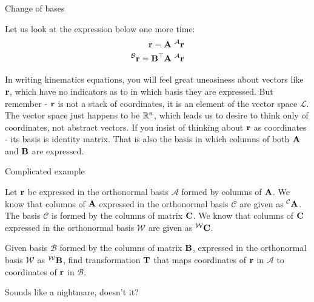 \documentclass{beamer}
\begin{document}
\begin{frame}{Change of bases}
	\begin{flushleft}
		
	 Let us look at the expression below one more time:
		\begin{align}
			\mathbf{r} = \mathbf{A} \ ^\mathcal{A}\mathbf{r} \\
			^\mathcal{B}\mathbf{r} = \mathbf{B}^\top \mathbf{A} \ ^\mathcal{A}\mathbf{r}
		\end{align}
		
		In writing kinematics equations, you will feel great uneasiness about vectors like $\mathbf{r}$, which have no indicators as to in which basis they are expressed. But remember - $\mathbf{r}$ is not a stack of coordinates, it is an element of the vector space $\mathscr{L}$. The vector space just happens to be $\mathbb{R}^n$, which leads us to desire to think only of coordinates, not abstract vectors. If you insist of thinking about $\mathbf{r}$ as coordinates - its basis is identity matrix. That is also the basis in which columns of both $\mathbf{A}$ and $\mathbf{B}$ are expressed. 
		
	\end{flushleft}
\end{frame}





\begin{frame}{Complicated example}
	\begin{flushleft}
		
		Let $\mathbf{r}$ be expressed in the orthonormal basis $\mathcal{A}$ formed by columns of $\mathbf{A}$. We know that columns of $\mathbf{A}$ expressed in the orthonormal basis $\mathcal{C}$ are given as $^\mathcal{C} \mathbf{A}$. The basis $\mathcal{C}$ is formed by the columns of matrix $\mathbf{C}$. We know that columns of $\mathbf{C}$ expressed in the orthonormal basis $\mathcal{W}$ are given as $^\mathcal{W} \mathbf{C}$.
		
		\bigskip
		
		Given basis $\mathcal{B}$ formed by the columns of matrix $\mathbf{B}$, expressed in the orthonormal basis $\mathcal{W}$ as $^\mathcal{W} \mathbf{B}$, find transformation $\mathbf{T}$ that maps coordinates of $\mathbf{r}$ in $\mathcal{A}$ to coordinates of $\mathbf{r}$ in $\mathcal{B}$.
		
		\bigskip
		
		Sounds like a nightmare, doesn't it?
		
	\end{flushleft}
\end{frame}
\end{document}
